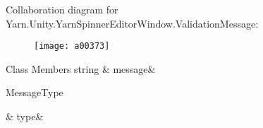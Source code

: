 Collaboration diagram for Yarn.\-Unity.\-Yarn\-Spinner\-Editor\-Window.\-Validation\-Message\-:
\nopagebreak
\begin{figure}[H]
\begin{center}
\leavevmode
\texttt{[image: a00373]}
\end{center}
\end{figure}
\begin{DoxyFields}{Class Members}
\hypertarget{a00180_a636dce6708e779c201fa5e7d01cf2955}{string}\label{a00180_a636dce6708e779c201fa5e7d01cf2955}
&
message&
\\
\hline

\hypertarget{a00180_a7d342190c7657fbbe85eb6fa66bcabb8}{Message\-Type}\label{a00180_a7d342190c7657fbbe85eb6fa66bcabb8}
&
type&
\\
\hline

\end{DoxyFields}
